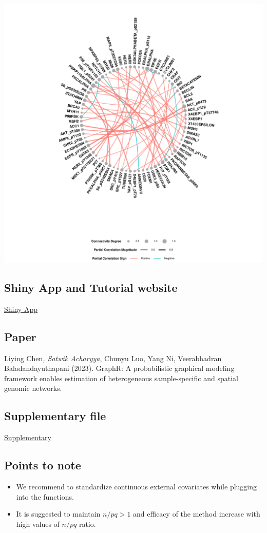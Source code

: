 \documentclass[
]{article}
\begin{document}
\includegraphics[width=1\linewidth]{man/figures/README-unnamed-chunk-3-1}

\hypertarget{shiny-app-and-tutorial-website}{%
\subsection{Shiny App and Tutorial
website}\label{shiny-app-and-tutorial-website}}

\href{https://bayesrx.shinyapps.io/GraphR/}{Shiny App}

\hypertarget{paper}{%
\subsection{Paper}\label{paper}}

Liying Chen\emph{, Satwik Acharyya}, Chunyu Luo, Yang Ni, Veerabhadran
Baladandayuthapani (2023). GraphR: A probabilistic graphical modeling
framework enables estimation of heterogeneous sample-specific and
spatial genomic networks.

\hypertarget{supplementary-file}{%
\subsection{Supplementary file}\label{supplementary-file}}

\href{https://bookdown.org/bayesrx/graphr_supplementary/}{Supplementary}

\hypertarget{points-to-note}{%
\subsection{Points to note}\label{points-to-note}}

\begin{itemize}
\item
  We recommend to standardize continuous external covariates while
  plugging into the functions.
\item
  It is suggested to maintain \(n/pq > 1\) and efficacy of the method
  increase with high values of \(n/pq\) ratio.
\end{itemize}
\end{document}
